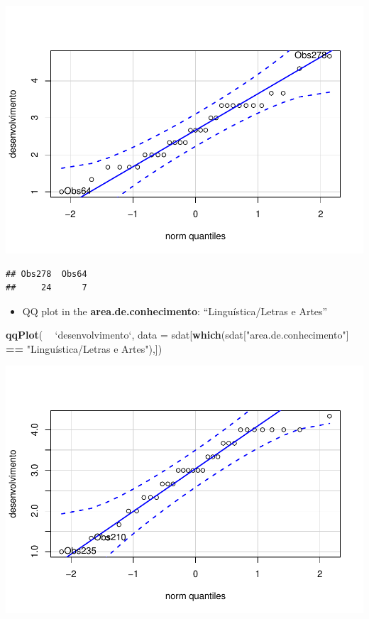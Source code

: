 \documentclass[]{article}
\newenvironment{Shaded}{\begin{snugshade}}{\end{snugshade}}
\newcommand{\DataTypeTok}[1]{\textcolor[rgb]{0.13,0.29,0.53}{#1}}
\newcommand{\KeywordTok}[1]{\textcolor[rgb]{0.13,0.29,0.53}{\textbf{#1}}}
\newcommand{\NormalTok}[1]{#1}
\newcommand{\OperatorTok}[1]{\textcolor[rgb]{0.81,0.36,0.00}{\textbf{#1}}}
\newcommand{\StringTok}[1]{\textcolor[rgb]{0.31,0.60,0.02}{#1}}
\providecommand{\tightlist}{%
  \setlength{\itemsep}{0pt}\setlength{\parskip}{0pt}}
\begin{document}
\includegraphics{factorialAnova_files/figure-latex/unnamed-chunk-28-1.pdf}

\begin{verbatim}
## Obs278  Obs64 
##     24      7
\end{verbatim}

\begin{itemize}
\tightlist
\item
  QQ plot in the \textbf{area.de.conhecimento}: ``Linguística/Letras e
  Artes''
\end{itemize}

\begin{Shaded}
\begin{Highlighting}[]
\KeywordTok{qqPlot}\NormalTok{( }\OperatorTok{~}\StringTok{ `}\DataTypeTok{desenvolvimento}\StringTok{`}\NormalTok{, }\DataTypeTok{data =}\NormalTok{ sdat[}\KeywordTok{which}\NormalTok{(sdat[}\StringTok{"area.de.conhecimento"}\NormalTok{] }\OperatorTok{==}\StringTok{ "Linguística/Letras e Artes"}\NormalTok{),])}
\end{Highlighting}
\end{Shaded}

\includegraphics{factorialAnova_files/figure-latex/unnamed-chunk-29-1.pdf}
\end{document}
